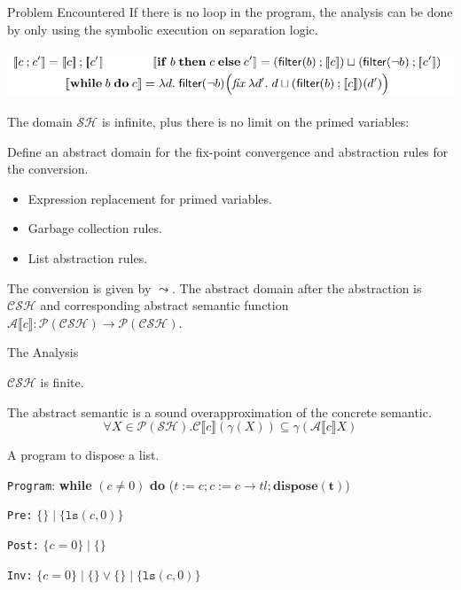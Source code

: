 \documentclass[aspectratio=1610, 13pt]{beamer}
\begin{document}
\begin{frame}{Problem Encountered}
    If there is no loop in the program, the analysis can be done by only using the symbolic execution on separation logic.
    \begin{center}
        \includegraphics[scale=0.4]{semantic.png}
    \end{center}
    The domain  $\mathcal{SH}$ is infinite, plus there is no limit on the primed variables:
    
    Define an abstract domain for the fix-point convergence and abstraction rules for the conversion.
    \begin{itemize}
        \item Expression replacement for primed variables.
        \item Garbage collection rules.
        \item List abstraction rules.
    \end{itemize}
    The conversion is given by $\leadsto$. The abstract domain after the abstraction is $\mathcal{CSH}$ and corresponding abstract semantic function $\mathcal{A}\llbracket c\rrbracket: \mathcal{P(CSH) \rightarrow P(CSH)}$.
\end{frame}

\begin{frame}{The Analysis}
    \begin{theorem}
    $\mathcal{CSH}$ is finite.
    \end{theorem}
    \begin{theorem}
    The abstract semantic is a sound overapproximation of the concrete semantic.\[\forall X\in \mathcal{P(SH)}. \mathcal{C}\llbracket c\rrbracket(\gamma(X)) \subseteq \gamma(\mathcal{A}\llbracket c\rrbracket X)\]
    \end{theorem}
    \begin{example}
    A program to dispose a list.
    
    \texttt{Program}: \textbf{while} $(c\ne0)$ \textbf{do} ($t:=c;c:=c\rightarrow tl;\mathbf{dispose(t)}$)
    
    \texttt{Pre:} $\{\}\mid\{\texttt{ls}(c,0)\}$
    
    \texttt{Post:} $\{c=0\}\mid \{\}$
    
    \texttt{Inv:} $\{c=0\}\mid \{\} \vee \{\}\mid \{\texttt{ls}(c,0)\}$
    \end{example}
\end{frame}
\end{document}
